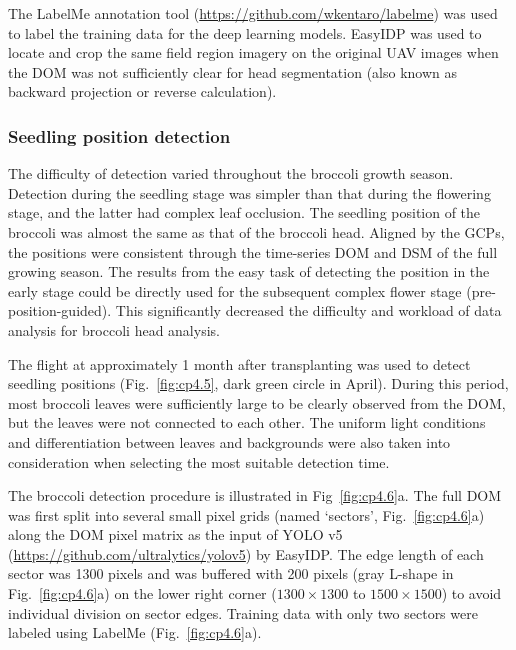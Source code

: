 

The LabelMe annotation tool (\url{https://github.com/wkentaro/labelme}) was used to label the training data for the deep learning models. EasyIDP \citep[\url{https://github.com/UTokyo-FieldPhenomics-Lab/EasyIDP}]{wang_easyidp_2021} was used to locate and crop the same field region imagery on the original UAV images when the DOM was not sufficiently clear for head segmentation (also known as backward projection or reverse calculation).

\subsubsection*{Seedling position detection}

The difficulty of detection varied throughout the broccoli growth season. Detection during the seedling stage was simpler than that during the flowering stage, and the latter had complex leaf occlusion. The seedling position of the broccoli was almost the same as that of the broccoli head. Aligned by the GCPs, the positions were consistent through the time-series DOM and DSM of the full growing season. The results from the easy task of detecting the position in the early stage could be directly used for the subsequent complex flower stage (pre-position-guided). This significantly decreased the difficulty and workload of data analysis for broccoli head analysis.

The flight at approximately 1 month after transplanting was used to detect seedling positions (Fig.~\ref{fig:cp4.5}, dark green circle in April). During this period, most broccoli leaves were sufficiently large to be clearly observed from the DOM, but the leaves were not connected to each other. The uniform light conditions and differentiation between leaves and backgrounds were also taken into consideration when selecting the most suitable detection time.

The broccoli detection procedure is illustrated in Fig~\ref{fig:cp4.6}a. The full DOM was first split into several small pixel grids (named `sectors', Fig.~\ref{fig:cp4.6}a) along the DOM pixel matrix as the input of YOLO v5 (\url{https://github.com/ultralytics/yolov5}) by EasyIDP. The edge length of each sector was 1300 pixels and was buffered with 200 pixels (gray L-shape in Fig.~\ref{fig:cp4.6}a) on the lower right corner ($1300 \times 1300$ to $1500 \times 1500$) to avoid individual division on sector edges. Training data with only two sectors were labeled using LabelMe (Fig.~\ref{fig:cp4.6}a). 

